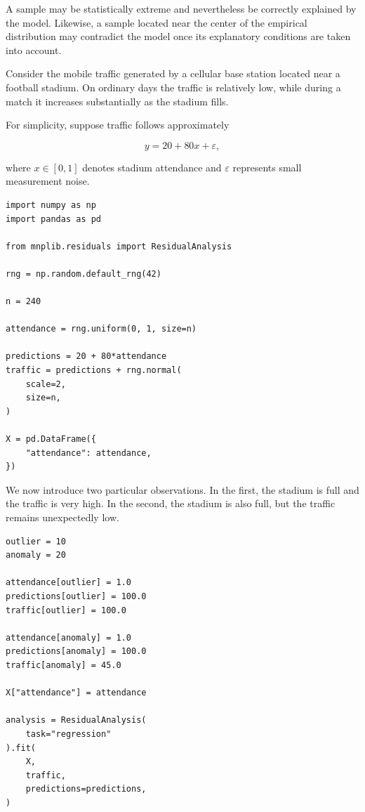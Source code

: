 A sample may be statistically extreme and nevertheless be correctly explained
by the model. Likewise, a sample located near the center of the empirical
distribution may contradict the model once its explanatory conditions are taken
into account.

\begin{example}
\label{ex:stadium_anomaly}

Consider the mobile traffic generated by a cellular base station located near a
football stadium. On ordinary days the traffic is relatively low, while during a
match it increases substantially as the stadium fills.

For simplicity, suppose traffic follows approximately

\[
y = 20 + 80x + \varepsilon,
\]

where \(x\in[0,1]\) denotes stadium attendance and \(\varepsilon\) represents
small measurement noise.

\begin{sourcecode}
{\scriptsize
\begin{verbatim}
import numpy as np
import pandas as pd

from mnplib.residuals import ResidualAnalysis

rng = np.random.default_rng(42)

n = 240

attendance = rng.uniform(0, 1, size=n)

predictions = 20 + 80*attendance
traffic = predictions + rng.normal(
    scale=2,
    size=n,
)

X = pd.DataFrame({
    "attendance": attendance,
})
\end{verbatim}}
\end{sourcecode}

We now introduce two particular observations. In the first, the stadium is full
and the traffic is very high. In the second, the stadium is also full, but the
traffic remains unexpectedly low.

\begin{sourcecode}
{\scriptsize
\begin{verbatim}
outlier = 10
anomaly = 20

attendance[outlier] = 1.0
predictions[outlier] = 100.0
traffic[outlier] = 100.0

attendance[anomaly] = 1.0
predictions[anomaly] = 100.0
traffic[anomaly] = 45.0

X["attendance"] = attendance

analysis = ResidualAnalysis(
    task="regression"
).fit(
    X,
    traffic,
    predictions=predictions,
)


\end{verbatim}}
\end{sourcecode}
\end{example}

